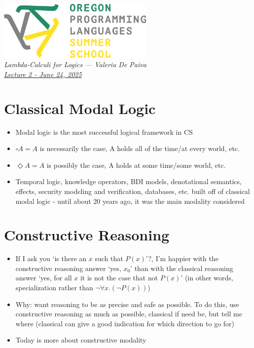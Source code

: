 \documentclass[11pt]{article}
\begin{document}
\thispagestyle{plain}
\begin{center}
\includegraphics[width=3in]{oplssLogo.png}\\[2\parskip]
\sffamily \LARGE \slshape Lambda-Calculi for Logics
--- \upshape Valeria De Paiva \\[2ex]
\href{https://github.com/vcvpaiva/DialecticaCategories/blob/master/OPLSS2025/OregonLecture2.pdf}{\large Lecture 2 - \slshape June 24, 2025}
\end{center}


\section{Classical Modal Logic}

\begin{itemize}
    \item Modal logic is the most successful logical framework in CS
    \item $\square A = A$ is necessarily the case, A holds all of the time/at every world, etc.
    \item $\Diamond A = A$ is possibly the case, A holds at some time/some world, etc.
    \item Temporal logic, knowledge operators, BDI models, denotational semantics, effects, security modeling and verification, databases, etc. built off of classical modal logic - until about 20 years ago, it was the main modality considered
\end{itemize}

\section{Constructive Reasoning}

\begin{itemize}
    \item If I ask you `is there an $x$ such that $P(x)$'?, I'm happier with the constructive reasoning answer `yes, $x_0$' than with the classical reasoning answer `yes, for all $x$ it is not the case that not $P(x)$' (in other words, specialization rather than $\neg \forall  x. (\neg P(x))$)
    \item Why: want reasoning to be as precise and safe as possible. To do this, use constructive reasoning as much as possible, classical if need be, but tell me where (classical can give a good indication for which direction to go for)
    \item Today is more about constructive modality
\end{itemize}
\end{document}
